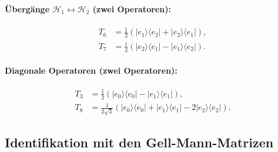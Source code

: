 \paragraph{Übergänge $\mathcal{H}_1 \leftrightarrow \mathcal{H}_2$
  (zwei Operatoren):}
\begin{align}
  T_6 &= \frac{1}{2}(|e_1\rangle\langle e_2| + |e_2\rangle\langle e_1|),
  \label{eq:T6} \\
  T_7 &= \frac{i}{2}(|e_2\rangle\langle e_1| - |e_1\rangle\langle e_2|).
  \label{eq:T7}
\end{align}

\paragraph{Diagonale Operatoren (zwei Operatoren):}
\begin{align}
  T_3 &= \frac{1}{2}(|e_0\rangle\langle e_0| - |e_1\rangle\langle e_1|),
  \label{eq:T3} \\
  T_8 &= \frac{1}{2\sqrt{3}}(|e_0\rangle\langle e_0|
        + |e_1\rangle\langle e_1|
        - 2|e_2\rangle\langle e_2|).
  \label{eq:T8}
\end{align}

\subsection{Identifikation mit den Gell-Mann-Matrizen}

